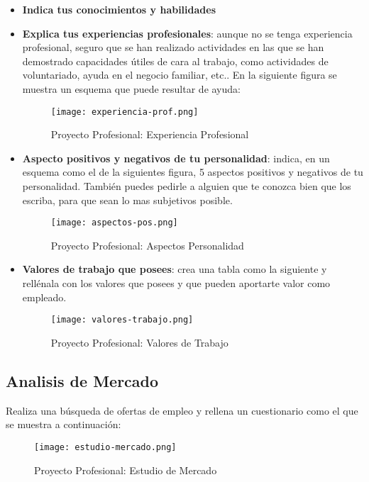 \begin{itemize}
    \item \textbf{Indica tus conocimientos y habilidades}
    \item \textbf{Explica tus experiencias profesionales}: aunque no se tenga experiencia profesional, seguro que se han realizado actividades en las que se han demostrado capacidades útiles de cara al trabajo, como actividades de voluntariado, ayuda en el negocio familiar, etc.. En la siguiente figura se muestra un esquema que puede resultar de ayuda:

    \begin{figure}[ht]
        \centering
        \texttt{[image: experiencia-prof.png]}
        \caption{Proyecto Profesional: Experiencia Profesional}
    \end{figure}

    \item \textbf{Aspecto positivos y negativos de tu personalidad}: indica, en un esquema como el de la siguientes figura, 5 aspectos positivos y negativos de tu personalidad. También puedes pedirle a alguien que te conozca bien que los escriba, para que sean lo mas subjetivos posible.

    \begin{figure}[ht]
        \centering
        \texttt{[image: aspectos-pos.png]}
        \caption{Proyecto Profesional: Aspectos Personalidad}
    \end{figure}

    \item \textbf{Valores de trabajo que posees}: crea una tabla como la siguiente y rellénala con los valores que posees y que pueden aportarte valor como empleado.

    \begin{figure}[ht]
        \centering
        \texttt{[image: valores-trabajo.png]}
        \caption{Proyecto Profesional: Valores de Trabajo}
    \end{figure}
\end{itemize}

\subsection{Analisis de Mercado}
Realiza una búsqueda de ofertas de empleo y rellena un cuestionario como el que se muestra a continuación:

\begin{figure}[ht]
    \centering
    \texttt{[image: estudio-mercado.png]}
    \caption{Proyecto Profesional: Estudio de Mercado}
\end{figure}

